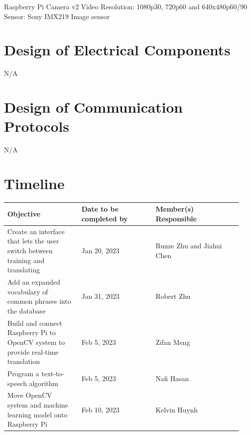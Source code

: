 \documentclass[12pt, titlepage]{article}
\begin{document}
Raspberry Pi Camera v2
Video Resolution: 1080p30, 720p60 and 640x480p60/90
Sensor: Sony IMX219 Image sensor

\section{Design of Electrical Components}

N/A

\section{Design of Communication Protocols}

N/A

\section{Timeline}

\renewcommand{\arraystretch}{1.2}
\noindent \begin{tabularx}{\textwidth}{p{0.3\linewidth}|p{0.3\linewidth}|p{0.35\linewidth}}
\toprule
\textbf{Objective} & \textbf{Date to be completed by} & \textbf{Member(s) Responsible}\\
\midrule
Create an interface that lets the user switch between training and translating & Jan 20, 2023 & Runze Zhu and Jiahui Chen\\
\hline
Add an expanded vocabulary of common phrases into the database & Jan 31, 2023 & Robert Zhu\\
\hline
Build and connect Raspberry Pi to OpenCV system to provide real-time translation & Feb 5, 2023 & Zifan Meng\\
\hline
Program a text-to-speech algorithm & Feb 5, 2023 & Nafi Hasan\\
\hline
Move OpenCV system and machine learning model onto Raspberry Pi & Feb 10, 2023 & Kelvin Huynh\\
\bottomrule
\end{tabularx}

% 

\newpage{}

\appendix


\end{document}

